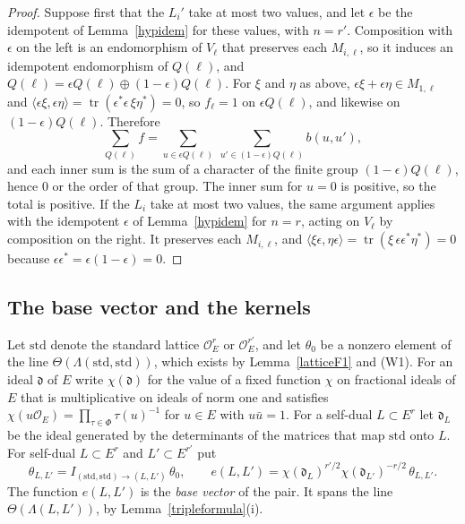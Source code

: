 \begin{proof}
Suppose first that the $L_i'$ take at most two values, and let $\epsilon$ be the idempotent of Lemma~\ref{hypidem} for these values, with $n=r'$. Composition with $\epsilon$ on the left is an endomorphism of $V_\ell$ that preserves each $M_{i,\ell}$, so it induces an idempotent endomorphism of $Q(\ell)$, and $Q(\ell)=\epsilon Q(\ell)\oplus(1-\epsilon)Q(\ell)$. For $\xi$ and $\eta$ as above, $\epsilon\xi+\epsilon\eta\in M_{1,\ell}$ and $\langle\epsilon\xi,\epsilon\eta\rangle=\operatorname{tr}(\epsilon^\ast\epsilon\,\xi\eta^\ast)=0$, so $f_\ell=1$ on $\epsilon Q(\ell)$, and likewise on $(1-\epsilon)Q(\ell)$. Therefore
\[
\sum_{Q(\ell)}f=\sum_{u\in\epsilon Q(\ell)}\ \sum_{u'\in(1-\epsilon)Q(\ell)}b(u,u'),
\]
and each inner sum is the sum of a character of the finite group $(1-\epsilon)Q(\ell)$, hence $0$ or the order of that group. The inner sum for $u=0$ is positive, so the total is positive. If the $L_i$ take at most two values, the same argument applies with the idempotent $\epsilon$ of Lemma~\ref{hypidem} for $n=r$, acting on $V_\ell$ by composition on the right. It preserves each $M_{i,\ell}$, and $\langle\xi\epsilon,\eta\epsilon\rangle=\operatorname{tr}(\xi\,\epsilon\epsilon^\ast\eta^\ast)=0$ because $\epsilon\epsilon^\ast=\epsilon(1-\epsilon)=0$.
\end{proof}

\subsection{The base vector and the kernels}\label{sec:kernels}

Let $\mathrm{std}$ denote the standard lattice $\mathcal O_E^r$ or $\mathcal O_E^{r'}$, and let $\theta_0$ be a nonzero element of the line $\Theta(\Lambda(\mathrm{std},\mathrm{std}))$, which exists by Lemma~\ref{latticeF1} and (W1). For an ideal $\mathfrak d$ of $E$ write $\chi(\mathfrak d)$ for the value of a fixed function $\chi$ on fractional ideals of $E$ that is multiplicative on ideals of norm one and satisfies $\chi(u\mathcal O_E)=\prod_{\tau\in\Phi}\tau(u)^{-1}$ for $u\in E$ with $u\bar u=1$. For a self-dual $L\subset E^r$ let $\mathfrak d_L$ be the ideal generated by the determinants of the matrices that map $\mathrm{std}$ onto $L$. For self-dual $L\subset E^r$ and $L'\subset E^{r'}$ put
\begin{equation}\label{basevec}
\theta_{L,L'}=I_{(\mathrm{std},\mathrm{std})\to(L,L')}\,\theta_0,\qquad e(L,L')=\chi(\mathfrak d_L)^{r'/2}\chi(\mathfrak d_{L'})^{-r/2}\,\theta_{L,L'} .
\end{equation}
The function $e(L,L')$ is the \emph{base vector} of the pair. It spans the line $\Theta(\Lambda(L,L'))$, by Lemma~\ref{tripleformula}(i).

